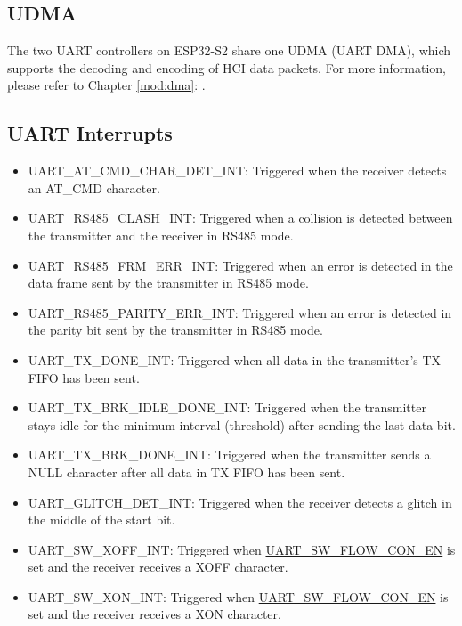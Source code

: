 \documentclass[main\_\_EN.tex]{subfiles}
\begin{document}
\subsection{UDMA}

The two UART controllers on ESP32-S2 share one UDMA (UART DMA), which supports the decoding and encoding of HCI data packets. For more information, please refer to Chapter \ref{mod:dma}: \textit{}.

\subsection{UART Interrupts}
\begin{itemize}
\item \label{int:UARTATCMDCHARDETINT}UART\_AT\_CMD\_CHAR\_DET\_INT: Triggered when the receiver detects an AT\_CMD character.
\item \label{int:UARTRS485CLASHINT}UART\_RS485\_CLASH\_INT: Triggered when a collision is detected between the transmitter and the receiver in RS485 mode.
\item \label{int:UARTRS485FRMERRINT}UART\_RS485\_FRM\_ERR\_INT: Triggered when an error is detected in the data frame sent by the transmitter in RS485 mode.
\item \label{int:UARTRS485PARITYERRINT}UART\_RS485\_PARITY\_ERR\_INT: Triggered when an error is detected in the parity bit sent by the transmitter in RS485 mode.
\item \label{int:UARTTXDONEINT}UART\_TX\_DONE\_INT: Triggered when all data in the transmitter's TX FIFO has been sent.
\item \label{int:UARTTXBRKIDLEDONEINT}UART\_TX\_BRK\_IDLE\_DONE\_INT: Triggered when the transmitter stays idle for the minimum interval (threshold) after sending the last data bit.
\item \label{int:UARTTXBRKDONEINT}UART\_TX\_BRK\_DONE\_INT: Triggered when the transmitter sends a NULL character after all data in TX FIFO has been sent.
\item \label{int:UARTGLITCHDETINT}UART\_GLITCH\_DET\_INT: Triggered when the receiver detects a glitch in the middle of the start bit.
\item \label{int:UARTSWXOFFINT}UART\_SW\_XOFF\_INT: Triggered when \hyperref[fielddesc:UARTSWFLOWCONEN]{UART\_SW\_FLOW\_CON\_EN} is set and the receiver receives a XOFF character.
\item \label{int:UARTSWXONINT}UART\_SW\_XON\_INT: Triggered when \hyperref[fielddesc:UARTSWFLOWCONEN]{UART\_SW\_FLOW\_CON\_EN} is set and the receiver receives a XON character.

\end{itemize}
\end{document}

